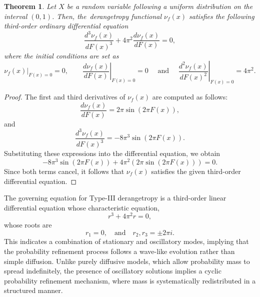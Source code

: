 \documentclass[sn-mathphys-num]{sn-jnl}%
\theoremstyle{thmstyleone}%
\newtheorem{theorem}{Theorem}%
\theoremstyle{thmstyletwo}%
\theoremstyle{thmstylethree}%
\begin{document}
\begin{theorem}
	Let $X$ be a random variable following a uniform distribution on the interval $(0,1)$. Then, the~derangetropy functional $\nu_f(x)$ satisfies the following {\color{black}third-order ordinary differential equation}
	\begin{equation} \frac{d^3 \nu_f(x)}{d F(x)^3}+ 4\pi^2 \frac{d \nu_f(x)}{d F(x)} = 0, \end{equation}
	where the initial conditions are set as
	$$
	\left.\nu_f(x)\right|_{F(x)=0}=0, \quad \left.\quad \frac{d \nu_f(x)}{d F(x)}\right|_{F(x)=0}=0 \quad \text { and }\left.\quad \frac{d^2 \nu_f(x)}{d F(x)^2}\right|_{F(x)=0}=4\pi^2.
	$$
\end{theorem}
\begin{proof}
	The first and third derivatives of $\nu_f(x)$ are computed as follows:	
	\begin{equation}
		\frac{d \nu_f(x)}{d F(x)}=2 \pi \sin (2 \pi F(x)),
	\end{equation}
	and
	\begin{equation}
		\frac{d^3 \nu_f(x)}{d F(x)^3}=-8 \pi^3 \sin (2 \pi F(x)).
	\end{equation}
	Substituting these expressions into the differential equation,	we obtain
	\begin{equation}
		-8 \pi^3 \sin (2 \pi F(x))+4 \pi^2(2 \pi \sin (2 \pi F(x)))=0.
	\end{equation}
	Since both terms cancel, it follows that $\nu_f(x)$ satisfies the given third-order differential equation.
\end{proof}



The governing equation for Type-III derangetropy is a third-order linear differential equation whose characteristic equation,
\begin{equation}
	r^3+4 \pi^2 r=0,
\end{equation}
whose roots are
\begin{equation}
	r_1=0, \quad \text{and} \quad r_2, r_3= \pm 2 \pi i.
\end{equation}
This indicates a combination of stationary and oscillatory modes, implying that the probability refinement process follows a wave-like evolution rather than simple diffusion. Unlike purely diffusive models, which allow probability mass to spread indefinitely, the presence of oscillatory solutions implies a cyclic probability refinement mechanism, where mass is systematically redistributed in a structured manner.
\end{document}
